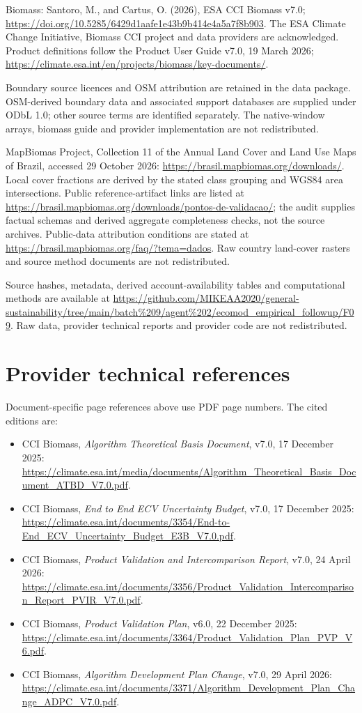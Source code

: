 \documentclass[11pt,a4paper]{article}
\begin{document}
Biomass: Santoro, M., and Cartus, O. (2026), ESA CCI Biomass v7.0; \url{https://doi.org/10.5285/6429d1aafe1e43b9b414e4a5a7f8b903}. The ESA Climate Change Initiative, Biomass CCI project and data providers are acknowledged. Product definitions follow the Product User Guide v7.0, 19 March 2026; \url{https://climate.esa.int/en/projects/biomass/key-documents/}.

Boundary source licences and OSM attribution are retained in the data package. OSM-derived boundary data and associated support databases are supplied under ODbL 1.0; other source terms are identified separately. The native-window arrays, biomass guide and provider implementation are not redistributed.

MapBiomas Project, Collection 11 of the Annual Land Cover and Land Use Maps of Brazil, accessed 29 October 2026: \url{https://brasil.mapbiomas.org/downloads/}. Local cover fractions are derived by the stated class grouping and WGS84 area intersections. Public reference-artifact links are listed at \url{https://brasil.mapbiomas.org/downloads/pontos-de-validacao/}; the audit supplies factual schemas and derived aggregate completeness checks, not the source archives. Public-data attribution conditions are stated at \url{https://brasil.mapbiomas.org/faq/?tema=dados}. Raw country land-cover rasters and source method documents are not redistributed.

Source hashes, metadata, derived account-availability tables and computational methods are available at \url{https://github.com/MIKEAA2020/general-sustainability/tree/main/batch%209/agent%202/ecomod_empirical_followup/F09}. Raw data, provider technical reports and provider code are not redistributed.


\section{Provider technical references}
Document-specific page references above use PDF page numbers. The cited editions are:
\begin{itemize}
\item CCI Biomass, \emph{Algorithm Theoretical Basis Document}, v7.0, 17 December 2025: \url{https://climate.esa.int/media/documents/Algorithm_Theoretical_Basis_Document_ATBD_V7.0.pdf}.
\item CCI Biomass, \emph{End to End ECV Uncertainty Budget}, v7.0, 17 December 2025: \url{https://climate.esa.int/documents/3354/End-to-End_ECV_Uncertainty_Budget_E3B_V7.0.pdf}.
\item CCI Biomass, \emph{Product Validation and Intercomparison Report}, v7.0, 24 April 2026: \url{https://climate.esa.int/documents/3356/Product_Validation_Intercomparison_Report_PVIR_V7.0.pdf}.
\item CCI Biomass, \emph{Product Validation Plan}, v6.0, 22 December 2025: \url{https://climate.esa.int/documents/3364/Product_Validation_Plan_PVP_V6.pdf}.
\item CCI Biomass, \emph{Algorithm Development Plan Change}, v7.0, 29 April 2026: \url{https://climate.esa.int/documents/3371/Algorithm_Development_Plan_Change_ADPC_V7.0.pdf}.
\end{itemize}
\end{document}
